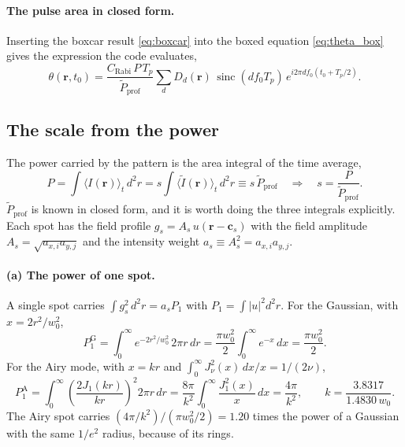 \paragraph{The pulse area in closed form.}
Inserting the boxcar result \eqref{eq:boxcar} into the boxed equation \eqref{eq:theta_box} gives the
expression the code evaluates,
\begin{equation}
\theta(\mathbf r,t_0)=\frac{C_\text{Rabi}\,P\,T_p}{\tilde P_\text{prof}}
\sum_d D_d(\mathbf r)\,\operatorname{sinc}(d f_0T_p)\,e^{i2\pi d f_0(t_0+T_p/2)}.
\label{eq:theta_closed}
\end{equation}

\subsection*{The scale from the power}
The power carried by the pattern is the area integral of the time average,
\begin{equation}
P=\int\langle I(\mathbf r)\rangle_t\,d^2r=s\int\langle\tilde I(\mathbf r)\rangle_t\,d^2r\equiv s\,\tilde P_\text{prof}
\quad\Longrightarrow\quad
s=\frac{P}{\tilde P_\text{prof}}.
\end{equation}
$\tilde P_\text{prof}$ is known in closed form, and it is worth doing the three integrals explicitly.
Each spot has the field profile $g_s=A_s\,u(\mathbf r-\mathbf c_s)$ with the field amplitude
$A_s=\sqrt{a_{x,i}a_{y,j}}$ and the intensity weight $a_s\equiv A_s^2=a_{x,i}a_{y,j}$.

\paragraph{(a) The power of one spot.}
A single spot carries $\int g_s^2\,d^2r=a_sP_1$ with $P_1=\int|u|^2d^2r$. For the Gaussian,
with $x=2r^2/w_0^2$,
\begin{equation}
P_1^\text{G}=\int_0^\infty e^{-2r^2/w_0^2}\,2\pi r\,dr=\frac{\pi w_0^2}{2}\int_0^\infty e^{-x}\,dx=\frac{\pi w_0^2}{2}.
\end{equation}
For the Airy mode, with $x=kr$ and $\int_0^\infty J_\nu^2(x)\,dx/x=1/(2\nu)$,
\begin{equation}
P_1^\text{A}=\int_0^\infty\left(\frac{2J_1(kr)}{kr}\right)^2 2\pi r\,dr
=\frac{8\pi}{k^2}\int_0^\infty\frac{J_1^2(x)}{x}\,dx=\frac{4\pi}{k^2},
\qquad k=\frac{3.8317}{1.4830\,w_0}.
\end{equation}
The Airy spot carries $(4\pi/k^2)/(\pi w_0^2/2)=1.20$ times the power of a Gaussian with the same
$1/e^2$ radius, because of its rings.

